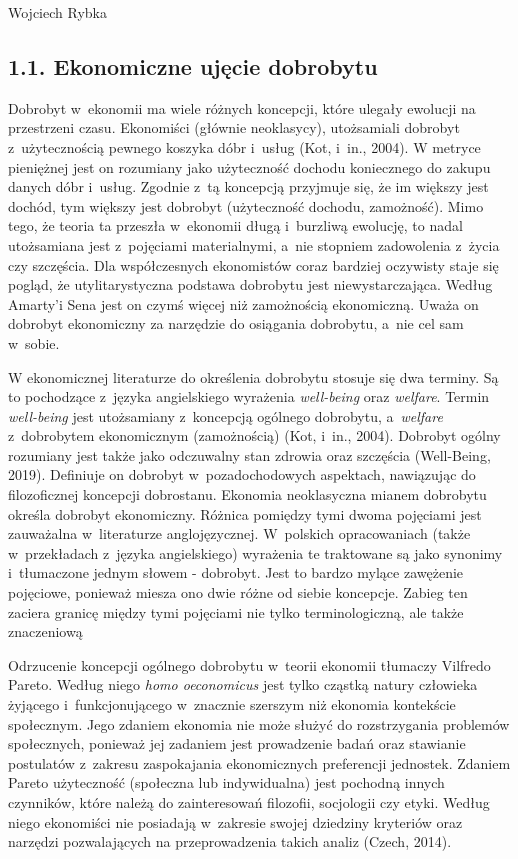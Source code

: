 \begin{artplenv}{Wojciech Rybka}
\subsection{1.1. Ekonomiczne ujęcie dobrobytu}
Dobrobyt w~ekonomii ma wiele różnych koncepcji, które ulegały ewolucji na przestrzeni czasu. Ekonomiści (głównie
neoklasycy), utożsamiali dobrobyt z~użytecznością pewnego koszyka dóbr i~usług
\label{ref:RND6VH6PmWfV2}(Kot, i~in., 2004).
W metryce pieniężnej jest on rozumiany jako użyteczność dochodu koniecznego do zakupu danych dóbr i~usług.
Zgodnie z~tą koncepcją przyjmuje się, że im większy jest dochód, tym większy jest dobrobyt (użyteczność dochodu,
zamożność). Mimo tego, że teoria ta przeszła w~ekonomii długą  i~burzliwą ewolucję, to nadal utożsamiana
jest z~pojęciami materialnymi, a~nie stopniem zadowolenia z~życia czy szczęścia. Dla współczesnych ekonomistów coraz bardziej
oczywisty staje się pogląd, że utylitarystyczna podstawa dobrobytu jest niewystarczająca. Według Amarty’i Sena jest on
czymś więcej niż zamożnością ekonomiczną. Uważa on dobrobyt ekonomiczny za narzędzie do osiągania dobrobytu, a~nie cel
sam w~sobie. 

W ekonomicznej literaturze do określenia dobrobytu stosuje się dwa terminy. Są to pochodzące z~języka angielskiego
wyrażenia \textit{well-being} oraz \textit{welfare}. Termin \textit{well-being} jest utożsamiany z~koncepcją ogólnego
dobrobytu, a~\textit{welfare} z~dobrobytem ekonomicznym (zamożnością)
\label{ref:RND1h4RYYJd2Q}(Kot, i~in., 2004).
Dobrobyt ogólny rozumiany jest także jako odczuwalny stan zdrowia oraz szczęścia \label{ref:RNDcJeLoRYp6q}(Well-Being,
2019). Definiuje on dobrobyt w~pozadochodowych aspektach, nawiązując do filozoficznej koncepcji dobrostanu. Ekonomia
neoklasyczna mianem dobrobytu określa dobrobyt ekonomiczny. Różnica pomiędzy tymi dwoma pojęciami jest
zauważalna w~literaturze anglojęzycznej. W~polskich opracowaniach (także w~przekładach z~języka angielskiego) wyrażenia te
traktowane są jako synonimy  i~tłumaczone jednym słowem - dobrobyt. Jest to bardzo mylące zawężenie pojęciowe, ponieważ
miesza ono dwie różne od siebie koncepcje. Zabieg ten zaciera granicę między tymi pojęciami nie tylko terminologiczną,
ale także znaczeniową

Odrzucenie koncepcji ogólnego dobrobytu w~teorii ekonomii tłumaczy Vilfredo Pareto. Według niego \textit{homo
oeconomicus} jest tylko cząstką natury człowieka żyjącego  i~funkcjonującego w~znacznie szerszym niż ekonomia
kontekście społecznym. Jego zdaniem ekonomia nie może służyć do rozstrzygania problemów społecznych, ponieważ jej
zadaniem jest prowadzenie badań oraz stawianie postulatów z~zakresu zaspokajania ekonomicznych preferencji jednostek.
Zdaniem Pareto użyteczność (społeczna lub indywidualna) jest pochodną innych czynników, które należą do zainteresowań
filozofii, socjologii czy etyki. Według niego ekonomiści nie posiadają w~zakresie swojej dziedziny kryteriów oraz
narzędzi pozwalających na przeprowadzenia takich analiz \label{ref:RNDgi5V6Ffk5h}(Czech, 2014).


\end{artplenv}
